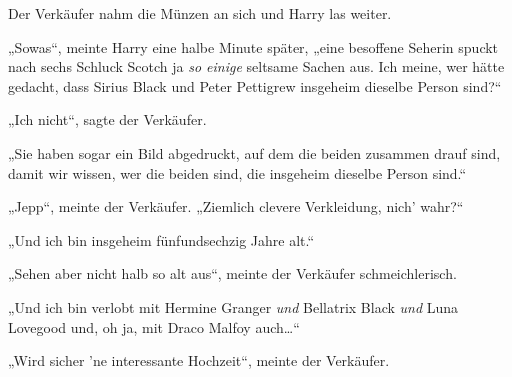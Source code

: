 Der Verkäufer nahm die Münzen an sich und Harry las weiter.

„Sowas“, meinte Harry eine halbe Minute später, „eine besoffene Seherin spuckt nach sechs Schluck Scotch ja \emph{so einige} seltsame Sachen aus. Ich meine, wer hätte gedacht, dass Sirius Black und Peter Pettigrew insgeheim dieselbe Person sind?“

„Ich nicht“, sagte der Verkäufer.

„Sie haben sogar ein Bild abgedruckt, auf dem die beiden zusammen drauf sind, damit wir wissen, wer die beiden sind, die insgeheim dieselbe Person sind.“

„Jepp“, meinte der Verkäufer. „Ziemlich clevere Verkleidung, nich’ wahr?“

„Und ich bin insgeheim fünfundsechzig Jahre alt.“

„Sehen aber nicht halb so alt aus“, meinte der Verkäufer schmeichlerisch.

„Und ich bin verlobt mit Hermine Granger \emph{und} Bellatrix Black \emph{und} Luna Lovegood und, oh ja, mit Draco Malfoy auch…“

„Wird sicher ’ne interessante Hochzeit“, meinte der Verkäufer.

